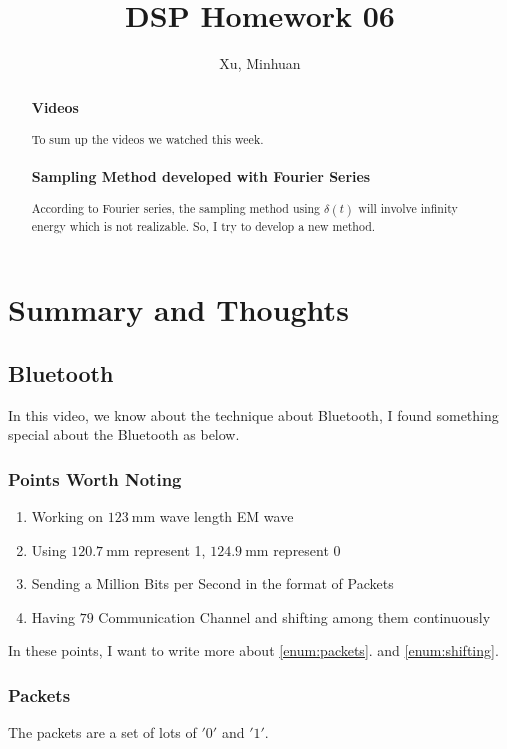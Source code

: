 \documentclass{article}
\begin{document}
\title{DSP Homework 06}
\author{Xu, Minhuan}
\maketitle
\tableofcontents
\begin{abstract}
    \subsubsection*{Videos}
        To sum up the videos we watched this week.
    \subsubsection*{Sampling Method developed with Fourier Series}
        According to Fourier series, the sampling method using $\delta(t)$ will involve infinity energy which is not realizable. So, I try to develop a new method.
\end{abstract}

\section{Summary and Thoughts}

\subsection{Bluetooth}
In this video, we know about the technique about Bluetooth, I found something special about the Bluetooth as below.

\subsubsection*{Points Worth Noting}
\begin{enumerate}
    \item Working on $123~\mathrm{mm}$ wave length EM wave
    \item Using $120.7~\mathrm{mm}$ represent 1, $124.9 ~ \mathrm{mm}$ represent 0
    \item Sending a Million Bits per Second in the format of {Packets} \label{enum:packets}
    \item Having $79$ Communication Channel and {shifting} among them continuously \label{enum:shifting}
\end{enumerate}

In these points, I want to write more about \ref{enum:packets}. and \ref{enum:shifting}.

\subsubsection*{Packets}
The packets are a set of lots of $'0'$ and $'1'$. 
\end{document}
